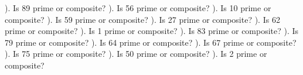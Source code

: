 \documentclass{article}%
\begin{document}
\newline%
\newline%
). Is 89 prime or composite?%
\newline%
\newline%
). Is 56 prime or composite?%
\newline%
\newline%
). Is 10 prime or composite?%
\newline%
\newline%
). Is 59 prime or composite?%
\newline%
\newline%
). Is 27 prime or composite?%
\newline%
\newline%
). Is 62 prime or composite?%
\newline%
\newline%
). Is 1 prime or composite?%
\newline%
\newline%
). Is 83 prime or composite?%
\newline%
\newline%
). Is 79 prime or composite?%
\newline%
\newline%
). Is 64 prime or composite?%
\newline%
\newline%
). Is 67 prime or composite?%
\newline%
\newline%
). Is 75 prime or composite?%
\newline%
\newline%
). Is 50 prime or composite?%
\newline%
\newline%
). Is 2 prime or composite?%
\newline%
\newline%
\end{document}
